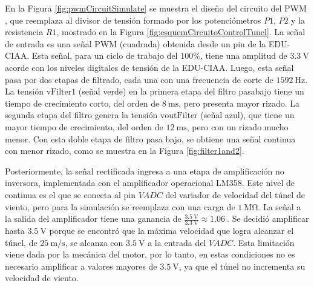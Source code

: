 En la Figura \ref{fig:pwmCircuitSimulate} se muestra el diseño del circuito del PWM \cite{EEVblog225}, que reemplaza al divisor de tensión formado por los potenciómetros $P1$, $P2$ y la resistencia $R1$, mostrado en la Figura \ref{fig:esquemCircuitoControlTunel}. La señal de entrada es una señal PWM (cuadrada) obtenida desde un pin de la EDU-CIAA. Esta señal, para un ciclo de trabajo del $100\%$, tiene una amplitud de $\SI{3.3}{\volt}$ acorde con los niveles digitales de tensión de la EDU-CIAA. Luego, esta señal pasa por dos etapas de filtrado, cada una con una frecuencia de corte de $\SI{1592}{\hertz}$. 
La tensión $\text{vFilter1}$ (señal verde) en la primera etapa del filtro pasabajo tiene un tiempo de crecimiento corto, del orden de $\SI{8}{\milli\second}$, pero presenta mayor rizado. La segunda etapa del filtro genera la tensión $\text{voutFilter}$ (señal azul), que tiene un mayor tiempo de crecimiento, del orden de $\SI{12}{\milli\second}$, pero con un rizado mucho menor. Con esta doble etapa de filtro pasa bajo, se obtiene una señal continua con menor rizado, como se muestra en la Figura \ref{fig:filter1and2}. 

Posteriormente, la señal rectificada ingresa a una etapa de amplificación no inversora, implementada con el amplificador operacional LM358. Este nivel de continua es el que se conecta al pin $VADC$ del variador de velocidad del túnel de viento, pero para la simulación se reemplaza con una carga de $\SI{1}{\mega\ohm}$. La señal a la salida del amplificador tiene una ganancia de $\frac{\SI{3.5}{\volt}}{\SI{3.3}{\volt}} \approx \SI{1.06}{}$. Se decidió amplificar hasta $\SI{3.5}{\volt}$ porque se encontró que la máxima velocidad que logra alcanzar el túnel, de $\SI{25}{\meter\per\second}$, se alcanza con $\SI{3.5}{\volt}$ a la entrada del $VADC$. Esta limitación viene dada por la mecánica del motor, por lo tanto, en estas condiciones no es necesario amplificar a valores mayores de $\SI{3.5}{\volt}$, ya que el túnel no incrementa su velocidad de viento.



